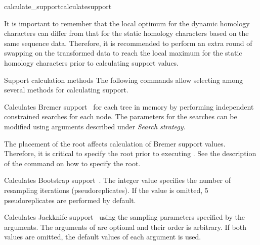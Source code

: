\begin{command}{calculate\_support}{calculatesupport}
\begin{poydescription}
\begin{statement}
                It is important to remember that the local optimum for the dynamic
                homology characters can differ from that for the static homology characters
                based on the same sequence data. Therefore, it is recommended to perform an extra round of swapping on the
                 transformed data to reach the local maximum for the static
                 homology characters prior to calculating support values.
            \end{statement}
            
            \end{poydescription}

	\begin{arguments}
		\begin{argumentgroup}{Support calculation methods}
            {The following commands allow selecting among several methods for
            calculating support.} 

                {Calculates Bremer support~\cite{Bremer1988, Kallersjoetal1992}
                for each tree in memory by performing independent constrained searches for each
                node. The parameters for the searches can be modified using arguments
                described under \emph{Search strategy}.} 
                {}
\begin{statement}
  	  The placement of the root affects calculation of Bremer support values.
	  Therefore, it is critical to specify the root prior to executing
	  . See the description of the
	  command  on how to specify the root.
	\end{statement}

                {Calculates Bootstrap support~\cite{Felsenstein1985}. 
                The integer value specifies
                the number of resampling iterations (pseudoreplicates). If the value
                is omitted, 5 pseudoreplicates are performed by default.} 
                {}

                {Calculates Jackknife support~\cite{Farrisetal1996} using the 
                sampling parameters specified by the arguments. The arguments of
                 are optional and their order is arbitrary. If
                both values are omitted, the default values of each argument is used.}
                {}
                

\end{argumentgroup}
\end{arguments}
\end{command}
